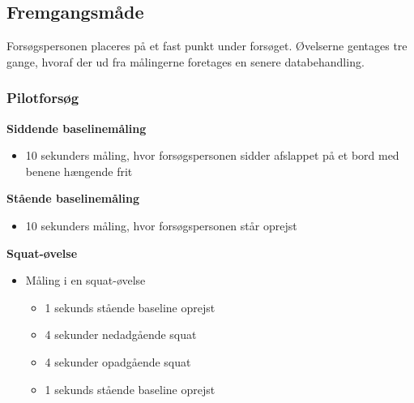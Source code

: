 \subsection{Fremgangsmåde}
Forsøgspersonen placeres på et fast punkt under forsøget. Øvelserne gentages tre gange, hvoraf der ud fra målingerne foretages en senere databehandling. 

\subsubsection{Pilotforsøg}

\textbf{Siddende baselinemåling}
\begin{itemize}
\item 10 sekunders måling, hvor forsøgspersonen sidder afslappet på et bord med benene hængende frit 
\end{itemize}
\vspace{3mm}
\noindent
\textbf{Stående baselinemåling}
\begin{itemize}
\item 10 sekunders måling, hvor forsøgspersonen står oprejst
\end{itemize}
\vspace{3mm}
\noindent	
\textbf{Squat-øvelse}
\begin{itemize}
\item Måling i en squat-øvelse
	\begin{itemize}
	\item 1 sekunds stående baseline oprejst
	\item 4 sekunder nedadgående squat 
	\item 4 sekunder opadgående squat
	\item 1 sekunds stående baseline oprejst
	\end{itemize}
\end{itemize}


